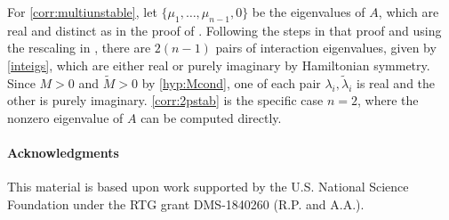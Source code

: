 \documentclass[12pt]{elsarticle}
\begin{document}
For \cref{corr:multiunstable}, let $\{ \mu_1,\dots,\mu_{n-1}, 0\}$ be the eigenvalues of $A$, which are real and distinct as in the proof of \cite[Theorem 5]{Parker2020}. Following the steps in that proof and using the rescaling in \cite[Theorem 3]{Sandstede1998}, there are $2(n-1)$ pairs of interaction eigenvalues, given by \cref{inteigs}, which are either real or purely imaginary by Hamiltonian symmetry. Since $M > 0$ and $\tilde{M} > 0$ by \cref{hyp:Mcond}, one of each pair $\lambda_i, \tilde{\lambda}_i$ is real and the other is purely imaginary. \cref{corr:2pstab} is the specific case $n = 2$, where the nonzero eigenvalue of $A$ can be computed directly.

\paragraph{Acknowledgments}

This material is based upon work supported by the U.S. National Science Foundation under the RTG grant DMS-1840260 (R.P. and A.A.).


\end{document}
